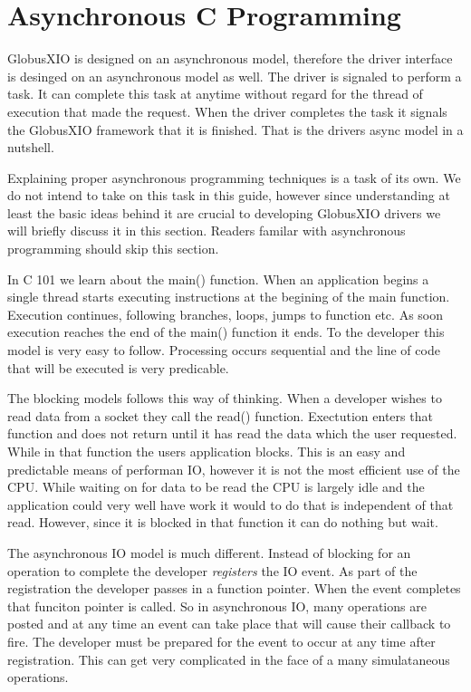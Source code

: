 \documentclass[11pt]{article}
\begin{document}
\section{Asynchronous C Programming}
GlobusXIO is designed on an asynchronous model, therefore
the driver interface is desinged on an asynchronous model as well.
The driver is signaled to perform a task.  It can complete this
task at anytime without regard for the thread of execution that
made the request.  When the driver completes the task it signals
the GlobusXIO framework that it is finished.  That is the drivers 
async model in a nutshell.  

Explaining
proper asynchronous programming techniques is a task of its own.  We
do not intend to take on this task in this guide, however since 
understanding at least the basic ideas behind it are crucial to 
developing GlobusXIO drivers we will briefly discuss it in this section.
Readers familar with asynchronous programming should skip this section.

In C 101 we learn about the main() function.  When an application 
begins a single thread starts executing instructions at the begining
of the main function.  Execution continues, following branches, loops,
jumps to function etc.  As soon execution reaches the end of the main()
function it ends.  To the developer this model is very easy to follow.
Processing occurs sequential and the line of code that will be executed
is very predicable.

The blocking models follows this way of thinking.  When a developer wishes
to read data from a socket they call the read() function.  Exectution 
enters that function and does not return until it has read the data which
the user requested.  While in that function the users application 
blocks.  This is an easy and predictable means of performan IO, however
it is not the most efficient use of the CPU.  While waiting on for data
to be read the CPU is largely idle and the application could very well
have work it would to do that is independent of that read.  However, since
it is blocked in that function it can do nothing but wait.

The asynchronous IO model is much different.  Instead of blocking
for an operation to complete the developer \emph{registers} the IO event.
As part of the registration the developer passes in a function pointer.
When the event completes that funciton pointer is called.  So in 
asynchronous IO, many operations are posted and at any time an event
can take place that will cause their callback to fire.  The developer
must be prepared for the event to occur at any time after registration.
This can get very complicated in the face of a many simulataneous
operations.
\end{document}
